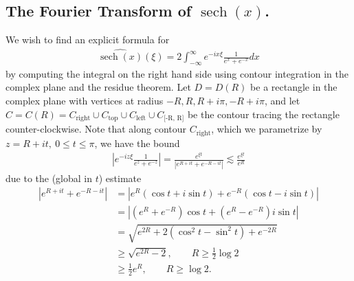 \documentclass[12pt,reqno]{amsart}
\numberwithin{equation}{section}  %
\newcommand{\wh}{\widehat}
\DeclareMathOperator{\sech}{sech}
\begin{document}
\subsection{The Fourier Transform of $\sech(x)$.} 
\label{ssec:four-sech}
        We wish to find an explicit
        formula for
        \begin{equation}
          \label{sech-four-init}
        \begin{split}
          \wh{\sech(x)}(\xi) = 2 \int_{- \infty}^{ \infty} e^{-i x \xi}
          \frac{1}{e^{x} + e^{-x}} dx 
        \end{split}
        \end{equation}
        by computing the integral on the right hand side using contour
        integration in the complex plane and the residue theorem.
        Let $D = D(R)$ be a rectangle in the complex plane with vertices at radius
        $ -R, R, R + i \pi, -R + i \pi$, and let $C = C(R) = C_{\text{right}}
        \cup C_{\text{top}}\cup C_{\text{left}} \cup C_{\text{[-R, R]}}$
        be the contour tracing the rectangle counter-clockwise. Note that along
        contour $C_{\text{right}}$, which we parametrize by $z = R + it, \ 0 \le
        t \le \pi$, we have the
        bound
        \begin{equation*}
        \begin{split}
          | e^{-iz \xi} \frac{1}{e^{z} + e^{-z}} | = \frac{e^{\xi t}}{| e^{R + it} +
          e^{-R -it}|} \lesssim \frac{e^{\xi t}}{e^{R}}
        \end{split}
        \end{equation*}
        due to the (global in $t$) estimate
        \begin{equation}
          \label{key-abs-est}
        \begin{split}
          | e^{R + it} + e^{-R -it} |
          & = | e^{R}(\cos t + i \sin t) + e^{-R}(\cos t - i \sin t) |
          \\
          & = | (e^{R} + e^{-R})\cos t + (e^{R} - e^{-R})i \sin t |
          \\
          & = \sqrt{e^{2R} + 2(\cos^{2} t - \sin^{2} t ) + e^{-2R}}
          \\
          & \ge \sqrt{e^{2R} -2}, \qquad R \ge \frac{1}{2}\log 2
          \\
          & \ge \frac{1}{2}e^{R}, \qquad R \ge \log 2.
        \end{split}
        \end{equation}
\end{document}
